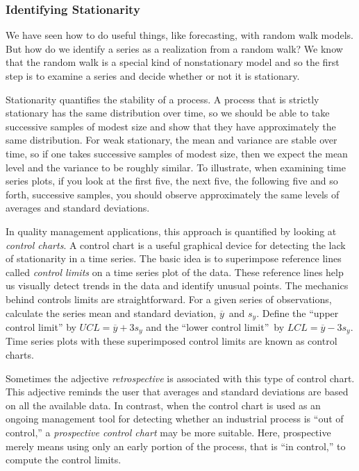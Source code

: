 \linejed

\subsubsection*{Identifying Stationarity}

We have seen how to do useful things, like forecasting, with random
walk models. But how do we identify a series as a realization from a
random walk? We know that the random walk is a special kind of
nonstationary model and so the first step is to examine a series and
decide whether or not it is stationary.

Stationarity quantifies the stability of a process. A process that
is strictly stationary has the same distribution over time, so we
should be able to take successive samples of modest size and show
that they have approximately the same distribution. For weak
stationary, the mean and variance are stable over time, so if one
takes successive samples of modest size, then we expect the mean
level and the variance to be roughly similar. To illustrate, when
examining time series plots, if you look at the first five, the next
five, the following five and so forth, successive samples, you
should observe approximately the same levels of averages and
standard deviations.



In quality management applications, this approach is quantified by
looking at \emph{control charts}.  A control chart is a useful
graphical device for detecting the lack of stationarity in a time
series. The basic idea is to superimpose reference lines called
\emph{control limits} on a time series plot of the data. These
reference lines help us visually detect trends in the data and
identify unusual points. The mechanics behind controls limits are
straightforward. For a given series of observations, calculate the
series mean and standard deviation, $\overline{y}$\ and $s_y$.
Define the
``upper control limit'' by $UCL=\overline{y}%
+3s_y$ and the ``lower control limit''\ by $LCL=\overline{y}-3s_y$.
Time series plots with these superimposed control limits are known
as control charts.

Sometimes the adjective \emph{retrospective} is associated with this
type of control chart. This adjective reminds the user that averages
and standard deviations are based on all the available data. In
contrast, when the control chart is used as an ongoing management
tool for detecting whether an industrial process is ``out of
control,'' a \emph{prospective control chart} may be more suitable.
Here, prospective merely means using only an early portion of the
process, that is ``in control,'' to compute the control limits.

